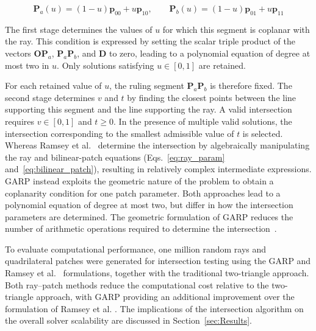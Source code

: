 \begin{equation}
\boldsymbol{P}_a(u)=(1-u)\boldsymbol{p}_{00}+u\boldsymbol{p}_{10},
\qquad
\boldsymbol{P}_b(u)=(1-u)\boldsymbol{p}_{01}+u\boldsymbol{p}_{11}
\end{equation}

The first stage determines the values of $u$ for which this segment is coplanar with the ray. This condition is expressed by setting the scalar triple product of the vectors $\boldsymbol{O}\boldsymbol{P}_a$, $\boldsymbol{P}_a\boldsymbol{P}_b$, and $\boldsymbol{D}$ to zero, leading to a polynomial equation of degree at most two in $u$. Only solutions satisfying $u \in [0,1]$ are retained.

For each retained value of $u$, the ruling segment $\boldsymbol{P}_a\boldsymbol{P}_b$ is therefore fixed. The second stage determines $v$ and $t$ by finding the closest points between the line supporting this segment and the line supporting the ray. A valid intersection requires $v \in [0,1]$ and $t \ge 0$. In the presence of multiple valid solutions, the intersection corresponding to the smallest admissible value of $t$ is selected. Whereas Ramsey et al.~\cite{Ramsey_2004} determine the intersection by algebraically manipulating the ray and bilinear-patch equations (Eqs.~\eqref{eq:ray_param} and~\eqref{eq:bilinear_patch}), resulting in relatively complex intermediate expressions. GARP instead exploits the geometric nature of the problem to obtain a coplanarity condition for one patch parameter. Both approaches lead to a polynomial equation of degree at most two, but differ in how the intersection parameters are determined. The geometric formulation of GARP reduces the number of arithmetic operations required to determine the intersection~\cite{Reshetov_2019}.

To evaluate computational performance, one million random rays and quadrilateral patches were generated for intersection testing using the GARP and Ramsey et al.~\cite{Ramsey_2004} formulations, together with the traditional two-triangle approach. Both ray--patch methods reduce the computational cost relative to the two-triangle approach, with GARP providing an additional improvement over the formulation of Ramsey et al. \cite{Ramsey_2004}. The implications of the intersection algorithm on the overall solver scalability are discussed in Section~\ref{sec:Results}.

